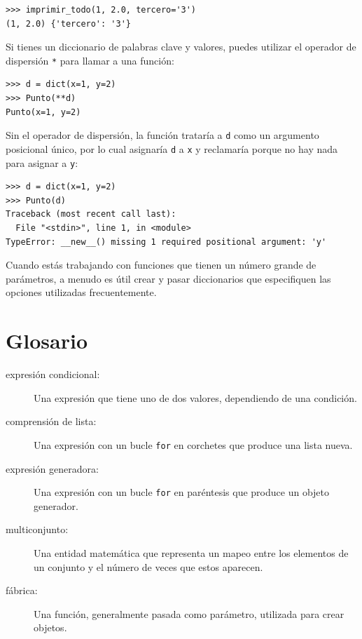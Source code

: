\documentclass[10pt]{book}
\begin{document}
\begin{verbatim}
>>> imprimir_todo(1, 2.0, tercero='3')
(1, 2.0) {'tercero': '3'}
\end{verbatim}
%
Si tienes un diccionario de palabras clave y valores, puedes utilizar el
operador de dispersión {\tt **} para llamar a una función:

\begin{verbatim}
>>> d = dict(x=1, y=2)
>>> Punto(**d)
Punto(x=1, y=2)
\end{verbatim}
%
Sin el operador de dispersión, la función trataría a {\tt d} como
un argumento posicional único, por lo cual asignaría {\tt d} a
{\tt x} y reclamaría porque no hay nada para asignar a {\tt y}:

\begin{verbatim}
>>> d = dict(x=1, y=2)
>>> Punto(d)
Traceback (most recent call last):
  File "<stdin>", line 1, in <module>
TypeError: __new__() missing 1 required positional argument: 'y'
\end{verbatim}
%
Cuando estás trabajando con funciones que tienen un número grande de
parámetros, a menudo es útil crear y pasar diccionarios
que especifiquen las opciones utilizadas frecuentemente.


\section{Glosario}

\begin{description}

\item[expresión condicional:] Una expresión que tiene uno de dos
valores, dependiendo de una condición.

\item[comprensión de lista:] Una expresión con un bucle {\tt for} en
corchetes que produce una lista nueva.

\item[expresión generadora:] Una expresión con un bucle {\tt for} en paréntesis
que produce un objeto generador.

\item[multiconjunto:] Una entidad matemática que representa un mapeo
entre los elementos de un conjunto y el número de veces que estos aparecen.

\item[fábrica:] Una función, generalmente pasada como parámetro, utilizada para
crear objetos.

\end{description}
\end{document}

